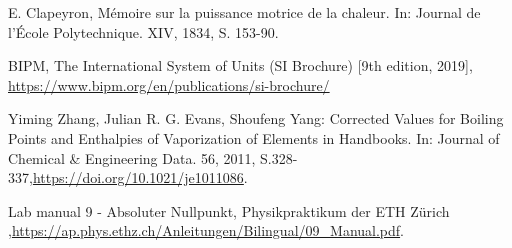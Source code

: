 
\begin{thebibliography}{99}


E. Clapeyron, M\'{e}moire sur la puissance motrice de la chaleur. In: Journal de l'\'{E}cole Polytechnique. XIV, 1834, S. 153-90.


BIPM, The International System of Units (SI Brochure) [9th edition, 2019],
\url{https://www.bipm.org/en/publications/si-brochure/}


Yiming Zhang, Julian R. G. Evans, Shoufeng Yang: Corrected Values for Boiling Points and Enthalpies of Vaporization of Elements in Handbooks. In: Journal of Chemical \& Engineering Data. 56, 2011, S.328-337,\url{https://doi.org/10.1021/je1011086}.

 Lab manual 9 - Absoluter Nullpunkt, Physikpraktikum der ETH Zürich ,\url{https://ap.phys.ethz.ch/Anleitungen/Bilingual/09_Manual.pdf}.


\end{thebibliography}